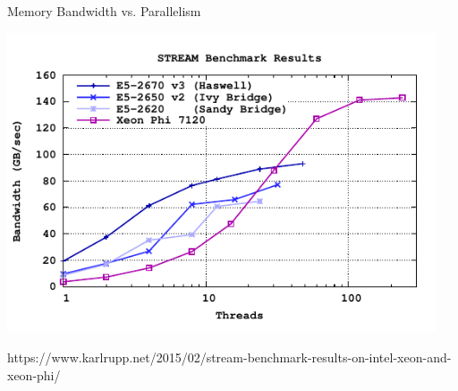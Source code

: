 




\begin{frame}[fragile]{Memory Bandwidth vs. Parallelism}
 \begin{center}
  \includegraphics[width=0.95\textwidth]{figures/stream}
 \end{center}
 {\scriptsize https://www.karlrupp.net/2015/02/stream-benchmark-results-on-intel-xeon-and-xeon-phi/ }
\end{frame}



